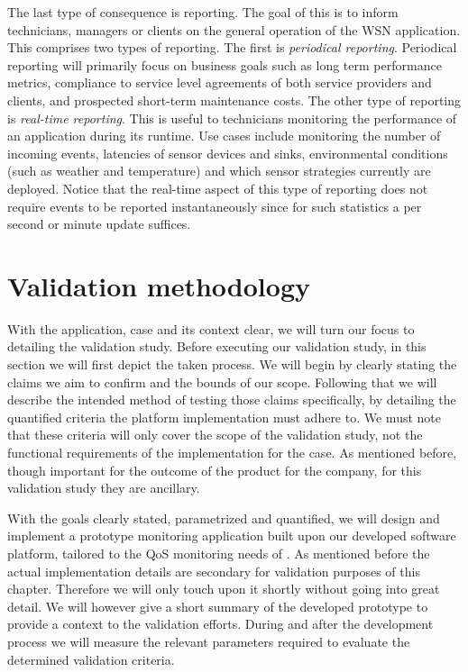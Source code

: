 The last type of consequence is reporting. The goal of this is to inform technicians, managers or clients on the general operation of the WSN application. This comprises two types of reporting. The first is \emph{periodical reporting}. Periodical reporting will primarily focus on business goals such as long term performance metrics, compliance to service level agreements of both service providers and clients, and prospected short-term maintenance costs. The other type of reporting is \emph{real-time reporting}. This is useful to technicians monitoring the performance of an application during its runtime. Use cases include monitoring the number of incoming events, latencies of sensor devices and sinks, environmental conditions (such as weather and temperature) and which sensor strategies currently are deployed. Notice that the real-time aspect of this type of reporting does not require events to be reported instantaneously since for such statistics a per second or minute update suffices.

\section{Validation methodology}
With the application, case and its context clear, we will turn our focus to detailing the validation study. Before executing our validation study, in this section we will first depict the taken process. We will begin by clearly stating the claims we aim to confirm and the bounds of our scope. Following that we will describe the intended method of testing those claims specifically, by detailing the quantified criteria the platform implementation must adhere to. We must note that these criteria will only cover the scope of the validation study, not the functional requirements of the implementation for the case. As mentioned before, though important for the outcome of the product for the company, for this validation study they are ancillary.

With the goals clearly stated, parametrized and quantified, we will design and implement a prototype monitoring application built upon our developed software platform, tailored to the QoS monitoring needs of \idsystems. As mentioned before the actual implementation details are secondary for validation purposes of this chapter. Therefore we will only touch upon it shortly without going into great detail. We will however give a short summary of the developed prototype to provide a context to the validation efforts. During and after the development process we will measure the relevant parameters required to evaluate the determined validation criteria.

